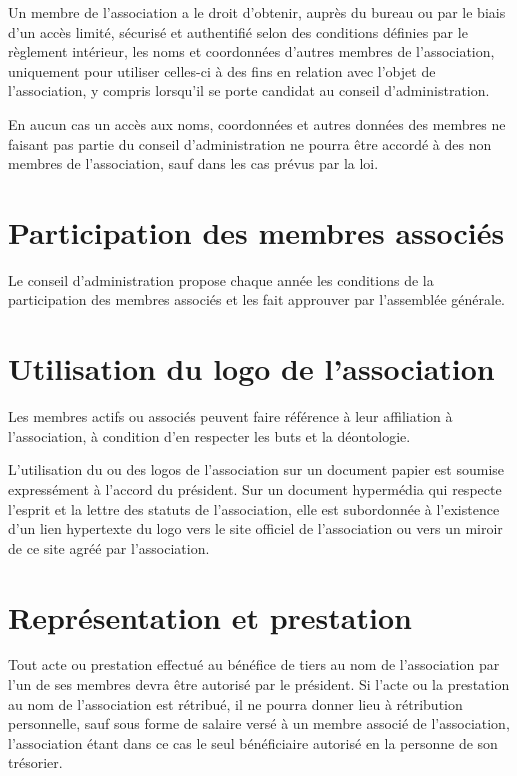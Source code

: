 \documentclass[a4wide,12pt]{scrartcl}
\begin{document}
Un membre de l'association a le droit d'obtenir, auprès du bureau ou
par le biais d'un accès limité, sécurisé et authentifié selon des
conditions définies par le règlement intérieur, les noms et
coordonnées d'autres membres de l'association, uniquement pour
utiliser celles-ci à des fins en relation avec l'objet de
l'association, y compris lorsqu'il se porte candidat au conseil
d'administration.

En aucun cas un accès aux noms, coordonnées et autres données des
membres ne faisant pas partie du conseil d'administration ne pourra
être accordé à des non membres de l'association, sauf dans les cas
prévus par la loi.

\section{Participation des membres associés}

Le conseil d'administration propose chaque année les conditions de la
participation des membres associés et les fait approuver par
l'assemblée générale.

\section{Utilisation du logo de l'association}

Les membres actifs ou associés peuvent faire référence à leur
affiliation à l'association, à condition d'en respecter les buts et la
déontologie.

L'utilisation du ou des logos de l'association sur un document papier
est soumise expressément à l'accord du président. Sur un document
hypermédia qui respecte l'esprit et la lettre des statuts de
l'association, elle est subordonnée à l'existence d'un lien hypertexte
du logo vers le site officiel de l'association ou vers un miroir de ce
site agréé par l'association.

\section{Représentation et prestation}

Tout acte ou prestation effectué au bénéfice de tiers au nom de
l'association par l'un de ses membres devra être autorisé par le
président. Si l'acte ou la prestation au nom de l'association est
rétribué, il ne pourra donner lieu à rétribution personnelle, sauf
sous forme de salaire versé à un membre associé de l'association,
l'association étant dans ce cas le seul bénéficiaire autorisé en la
personne de son trésorier.
\end{document}
